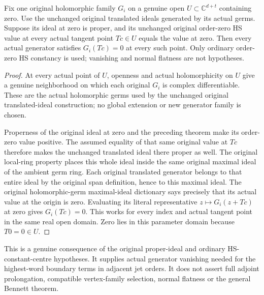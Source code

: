 \begin{theorem}
\label{hir:actual-original-hs-zero-constant-centre-generators-vanish}
\leanok
Fix one original holomorphic family $G_i$ on a genuine open
$U\subset\mathbb C^{d+t}$ containing zero. Use the unchanged original
translated ideals generated by its actual germs. Suppose its ideal at
zero is proper, and its unchanged original order-zero HS value at
every actual tangent point $Tc\in U$ equals the value at zero.
Then every actual generator satisfies $G_i(Tc)=0$ at every such point.
Only ordinary order-zero HS constancy is used; vanishing and normal
flatness are not hypotheses.
\end{theorem}
\begin{proof}
At every actual point of $U$, openness and actual holomorphicity on
$U$ give a genuine neighborhood on which each original $G_i$ is
complex differentiable. These are the actual holomorphic germs used
by the unchanged original translated-ideal construction; no global
extension or new generator family is chosen.

Properness of the original ideal at zero and the preceding theorem
make its order-zero value positive. The assumed equality of that same
original value at $Tc$ therefore makes the unchanged translated ideal
there proper as well. The original local-ring property places this
whole ideal inside the same original maximal ideal of the ambient
germ ring. Each original translated generator belongs to that entire
ideal by the original span definition, hence to this maximal ideal.
The original holomorphic-germ maximal-ideal dictionary says precisely
that its actual value at the origin is zero. Evaluating its literal
representative $z\mapsto G_i(z+Tc)$ at zero gives $G_i(Tc)=0$.
This works for every index and actual tangent point in the same real
open domain. Zero lies in this parameter domain because $T0=0\in U$.
\end{proof}

This is a genuine consequence of the original proper-ideal and ordinary
HS-constant-centre hypotheses. It supplies actual generator vanishing
needed for the highest-word boundary terms in adjacent jet orders.
It does not assert full adjoint prolongation, compatible vertex-family
selection, normal flatness or the general Bennett theorem.

